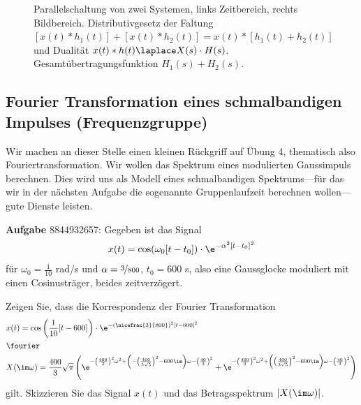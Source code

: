 \begin{figure}
\caption{Parallelschaltung von zwei Systemen, links Zeitbereich, rechts Bildbereich.
Distributivgesetz der Faltung
$[x(t)\ast h_1(t)]+[x(t) \ast h_2(t)] = x(t) \ast [h_1(t)+h_2(t)]$
und Dualität $x(t)\ast h(t) \laplace X(s) \cdot H(s)$.
Gesamtübertragungsfunktion $H_1(s) + H_2(s)$.}
\label{fig:tikz_parallel_081294E23C}
\end{figure}

















\clearpage
\subsection{Fourier Transformation eines schmalbandigen Impulses (Frequenzgruppe)}
\label{sec:8844932657}
\begin{Ziel}
Wir machen an dieser Stelle einen kleinen Rückgriff auf Übung 4, thematisch
also Fouriertransformation.
Wir wollen das Spektrum eines modulierten Gaussimpuls berechnen.
Dies wird uns als Modell eines schmalbandigen Spektrums---für das wir in der nächsten
Aufgabe die sogenannte Gruppenlaufzeit berechnen wollen---gute
Dienste leisten.
\end{Ziel}
\textbf{Aufgabe} {\tiny 8844932657}: Gegeben ist das Signal
\begin{align}
  x(t) = \cos(\omega_0 [t-t_0]) \cdot \e^{-\alpha^2 [t-t_0]^2}
\end{align}
für $\omega_0 = \frac{1}{10}$ rad/s und $\alpha=\nicefrac{3}{800}$, $t_0 = 600$ s,
also eine Gaussglocke moduliert mit einen Cosinusträger, beides zeitverzögert.

Zeigen Sie, dass die Korrespondenz der Fourier Transformation
\begin{align}
  &x(t) = \cos\left(\frac{1}{10} [t-600]\right) \cdot \e^{-\left(\nicefrac{3}{800}\right)^2 [t-600]^2}\\
  &\fourier\nonumber\\
  &X(\im\omega) = \frac{400}{3}\sqrt{\pi}\left(
  \e^{-\left(\frac{400}{3}\right)^2 \omega^2 + \left(-\left(\frac{400}{3\sqrt{5}}\right)^2-600\im\right)\omega - \left(\frac{40}{3}\right)^2}+
  \e^{-\left(\frac{400}{3}\right)^2 \omega^2 + \left(\left(\frac{400}{3\sqrt{5}}\right)^2-600\im\right)\omega - \left(\frac{40}{3}\right)^2}\right)
\end{align}
gilt.
Skizzieren Sie das Signal $x(t)$ und das Betragsspektrum $|X(\im\omega)|$.

